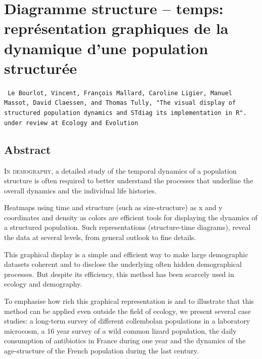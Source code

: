 \chapter[Diagramme structure -- temps: remprésentation graphiques de la
dynamique d'une population structurée][Diagramme structure -- temps]{Diagramme structure -- temps: représentation graphiques de la
dynamique d'une population structurée}\label{Chap:STDiag}

\vspace{4cm}

\begin{Spacing}{1}
\texttt{
Le Bourlot, Vincent, François Mallard, Caroline Ligier, Manuel Massot, 
David Claessen, and Thomas Tully, "The visual display of structured population dynamics and STdiag its implementation in R".\\
under review at Ecology and Evolution
}
\end{Spacing}

\section*{Abstract}

  
\lettrine[lines=3]{I}{n demography}, a detailed study of the temporal dynamics
of a population structure is often required to better understand the processes
that underline the overall dynamics and the individual life histories.

Heatmaps using time and structure (such as size-structure) as x and y
coordinates and density as colors are efficient tools for displaying the
dynamics of a structured population. Such representations (structure-time
diagrams), reveal the data at several levels, from general outlook to fine
details.

This graphical display is a simple and efficient way to make large demographic
datasets coherent and to disclose the underlying often hidden demographical
processes. But despite its efficiency, this method has been scarcely used in
ecology and demography.

To emphasise how rich this graphical representation is and to illustrate that
this method can be applied even outside the field of ecology, we present several
case studies: a long-term survey of different collembolan populations in a
laboratory microcosm, a 16 year survey of a wild common lizard population, the
daily consumption of antibiotics in France during one year and the dynamics of
the age-structure of the French population during the last century.


